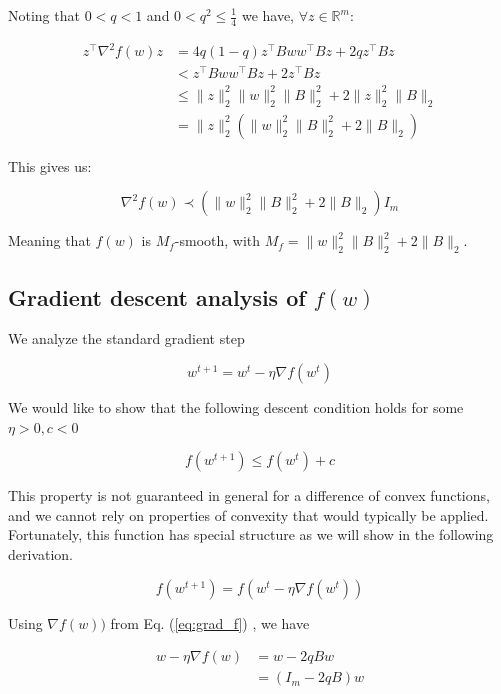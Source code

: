 \documentclass[11pt]{article}
\begin{document}
Noting that $0 < q < 1$ and $0 < q^2 \leq \frac{1}{4}$ we have, $\forall z \in \mathbb{R}^m$:

\begin{align*}
z^{\top} \nabla^2 f(w) z 
&= 4q(1-q) z^{\top} Bww^{\top}B z + 2q z^{\top} B z \\
&< z^{\top} Bww^{\top}B z + 2 z^{\top} B z \\
&\leq \|z\|_2^2 \|w\|_2^2 \|B\|_2^2 + 2 \|z\|_2^2 \|B\|_2 \\
&= \|z\|_2^2 ( \|w\|_2^2 \|B\|_2^2 + 2 \|B\|_2 ) 
\end{align*}

This gives us:

\begin{equation}
    \nabla^2 f(w) \prec ( \|w\|_2^2 \|B\|_2^2 + 2 \|B\|_2 ) I_m
\end{equation}

Meaning that $f(w)$ is $M_f$-smooth, with $M_f = \|w\|_2^2 \|B\|_2^2 + 2 \|B\|_2$.

\subsection{Gradient descent analysis of $f(w)$}

We analyze the standard gradient step

\begin{equation}
    w^{t+1} = w^t - \eta \nabla f(w^t)
\end{equation}

We would like to show that the following descent condition holds for some $\eta > 0, c < 0$

\begin{equation}
\label{eq:descent_condition}
    f(w^{t+1}) \leq f(w^t) + c
\end{equation}

This property is not guaranteed in general for a difference of convex functions, and we cannot rely on properties of convexity that would typically be applied. Fortunately, this function has special structure as we will show in the following derivation.

\begin{equation}
    f(w^{t+1}) = f(w^t - \eta \nabla f(w^t)) 
\end{equation}

Using $\nabla f(w))$ from Eq. (\ref{eq:grad_f}) , we have

\begin{align*}
    w - \eta \nabla f(w) &= w - 2qBw \\
    &= (I_m - 2qB)w
\end{align*}
\end{document}
